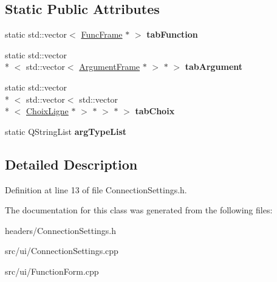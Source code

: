 \subsection*{Static Public Attributes}
\begin{DoxyCompactItemize}
\item 
\hypertarget{classConnectionSettings_ae84807deffb7c52220cca228d29b18ff}{static std\+::vector$<$ \hyperlink{classFuncFrame}{Func\+Frame} $\ast$ $>$ {\bfseries tab\+Function}}\label{classConnectionSettings_ae84807deffb7c52220cca228d29b18ff}

\item 
\hypertarget{classConnectionSettings_a439ae757f9ef6cd2a035ac9eae0721b5}{static std\+::vector\\*
$<$ std\+::vector$<$ \hyperlink{classArgumentFrame}{Argument\+Frame} $\ast$ $>$ $\ast$ $>$ {\bfseries tab\+Argument}}\label{classConnectionSettings_a439ae757f9ef6cd2a035ac9eae0721b5}

\item 
\hypertarget{classConnectionSettings_af5b6db02baab00f652f609ddef48a771}{static std\+::vector\\*
$<$ std\+::vector$<$ std\+::vector\\*
$<$ \hyperlink{classChoixLigne}{Choix\+Ligne} $\ast$ $>$ $\ast$ $>$ $\ast$ $>$ {\bfseries tab\+Choix}}\label{classConnectionSettings_af5b6db02baab00f652f609ddef48a771}

\item 
\hypertarget{classConnectionSettings_afe95edc3c1946bd9bd600bd53519e4cd}{static Q\+String\+List {\bfseries arg\+Type\+List}}\label{classConnectionSettings_afe95edc3c1946bd9bd600bd53519e4cd}

\end{DoxyCompactItemize}


\subsection{Detailed Description}


Definition at line 13 of file Connection\+Settings.\+h.



The documentation for this class was generated from the following files\+:\begin{DoxyCompactItemize}
\item 
headers/Connection\+Settings.\+h\item 
src/ui/Connection\+Settings.\+cpp\item 
src/ui/Function\+Form.\+cpp\end{DoxyCompactItemize}
